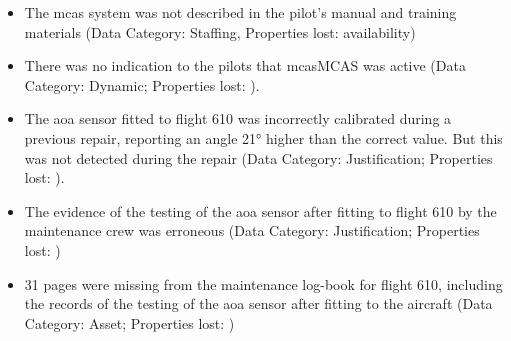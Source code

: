 \begin{itemize}
    \item The \gls{mcas} system was not described in the pilot's manual and training materials (Data Category: Staffing, Properties lost: \gls{availability})
    \item There was no indication to the pilots that \gls{mcas}MCAS was active (Data Category: Dynamic; Properties lost: ).
    \item The \gls{aoa} sensor fitted to flight 610 was incorrectly calibrated during a previous repair,
      reporting an angle 21° higher than the correct value.
      But this was not detected during the repair
      (Data Category: Justification; Properties lost: ).
    \item The evidence of the testing of the \gls{aoa} sensor after fitting to flight 610 by the maintenance crew was erroneous (Data Category: Justification; Properties lost: )
    \item 31 pages were missing from the maintenance log-book for flight 610, including the records of the testing of the \gls{aoa} sensor after fitting to the aircraft (Data Category: Asset; Properties lost: )

\end{itemize}
